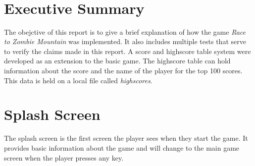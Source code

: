 \documentclass{article}
\title{
\vspace{2in}
\textmd{\huge\textbf{\Class}}\\
\textmd{{\Title}}\\
\vspace{3in}
\textmd{{\AuthorName}}\\
}
\begin{document}
\maketitle
\clearpage



\newpage
\tableofcontents
\newpage

\section{Executive Summary}
The obejctive of this report is to give a brief explanation of how the game \emph{Race to Zombie Mountain} was implemented. It also includes multiple tests that serve to verify the claims made in this report. 
\newline
A score and highscore table system were developed as an extension to the basic game. The highscore table can hold information about the score and the name of the player for the top 100 scores. This data is held on a local file called \emph{highscores}. 
\clearpage

\section{Splash Screen}
 The splash screen is the first screen the player sees when they start the game. It provides basic information about the game and will change to the main game screen when the player presses any key.
\end{document}
